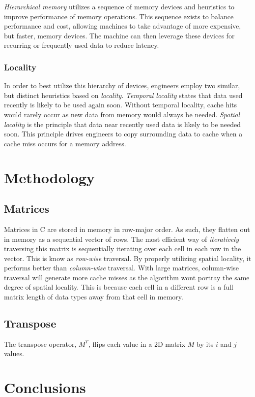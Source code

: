 \documentclass[conference]{IEEEtran}
\begin{document}
\emph{Hierarchical memory} utilizes a sequence of memory devices and
heuristics to improve performance of memory operations. This sequence
exists to balance performance and cost, allowing machines to take
advantage of more expensive, but faster, memory devices. The machine can
then leverage these devices for recurring or frequently used data to
reduce latency.

\subsubsection{Locality}\label{locality}

In order to best utilize this hierarchy of devices, engineers employ two
similar, but distinct heuristics based on \emph{locality}.
\emph{Temporal locality} states that data used recently is likely to be
used again soon. Without temporal locality, cache hits would rarely
occur as new data from memory would always be needed. \emph{Spatial
locality} is the principle that data near recently used data is likely
to be needed soon. This principle drives engineers to copy surrounding
data to cache when a cache miss occurs for a memory address.

\section{Methodology}\label{methodology}

\subsection{Matrices}\label{matrices}

Matrices in C are stored in memory in row-major order. As such, they
flatten out in memory as a sequential vector of rows. The most efficient
way of \emph{iteratively} traversing this matrix is sequentially
iterating over each cell in each row in the vector. This is know as
\emph{row-wise} traversal. By properly utilizing spatial locality, it
performs better than \emph{column-wise} traversal. With large matrices,
column-wise traversal will generate more cache misses as the algorithm
wont portray the same degree of spatial locality. This is because each
cell in a different row is a full matrix length of data types away from
that cell in memory.

\subsection{Transpose}\label{transpose}

The transpose operator, \(M^T\), flips each value in a 2D matrix \(M\)
by its \(i\) and \(j\) values.

\section{Conclusions}\label{conclusions}
\end{document}
